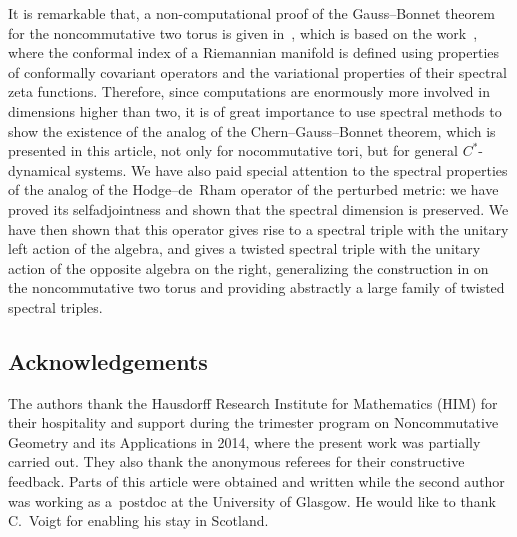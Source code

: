 \documentclass[pdftex]{sigma}
\numberwithin{equation}{section}
\begin{document}
It is remarkable that, a non-computational proof
of the Gauss--Bonnet theorem for the noncommutative two torus
is given in~\cite{ModCurvCM}, which is based on the work~\cite{BransonetalConInd}, where
the conformal index of a Riemannian manifold is def\/ined using properties of conformally covariant operators and the variational
properties of their spectral zeta functions. Therefore, since computations
are enormously more involved in dimensions higher than two, it is
of great importance to use spectral methods to show the existence
of the analog of the Chern--Gauss--Bonnet theorem, which is presented
in this article, not only for nocommutative tori, but for general $C^*$-dynamical
systems. We have also paid special attention to the spectral properties
of the analog of the Hodge--de~Rham operator of the perturbed metric: we have
proved its selfadjointness and shown that the spectral dimension is preserved.
We have then shown that this operator gives rise to a spectral triple with the unitary
left action of the algebra, and gives a twisted spectral triple with the unitary action of the
opposite algebra on the right, generalizing the construction in \cite{GaussBonnet-ConnesTretkoff} on the noncommutative
two torus and providing abstractly a large family of twisted spectral triples.

\subsection*{Acknowledgements}
The authors thank the Hausdorf\/f Research Institute
for Mathematics (HIM) for their hospitality and support during
the trimester program on Noncommutative Geometry
and its Applications in 2014, where the present work
was partially carried out. They also thank the anonymous referees
for their constructive feedback.
Parts of this article were obtained and written while the second author was working as a~postdoc at the University of Glasgow. He would like to thank C.~Voigt for enabling his stay in Scotland.
	
\end{document}
